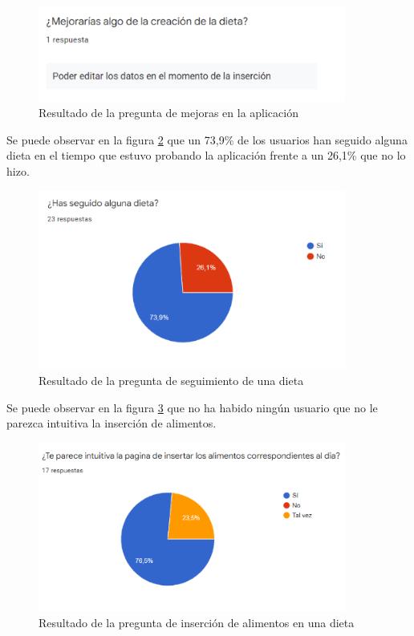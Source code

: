 \begin{figure}[H]
    \centering
    \includegraphics[width=0.9\textwidth]{Images/Capitulo8/Capitulo8.2/grafico7.png}
    \caption{Resultado de la pregunta de mejoras en la aplicación}
    \label{fig:grafico_7}
\end{figure}

Se puede observar en la figura  \ref{fig:grafico_8}  que un 73,9\% de los usuarios han seguido alguna dieta en el tiempo que estuvo probando la aplicación frente a un 26,1\% que no lo hizo.

\begin{figure}[H]
    \centering
    \includegraphics[width=0.9\textwidth]{Images/Capitulo8/Capitulo8.2/grafico8.png}
    \caption{Resultado de la pregunta de seguimiento de una dieta}
    \label{fig:grafico_8}
\end{figure}

Se puede observar en la figura \ref{fig:grafico_9} que no ha habido ningún usuario que no le parezca intuitiva la inserción de alimentos.

\begin{figure}[H]
    \centering
    \includegraphics[width=0.9\textwidth]{Images/Capitulo8/Capitulo8.2/grafico9.png}
    \caption{Resultado de la pregunta de inserción de alimentos en una dieta}
    \label{fig:grafico_9}
\end{figure}

